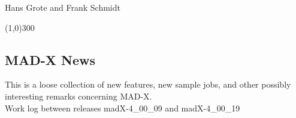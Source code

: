 

Hans Grote and Frank Schmidt 

\line(1,0){300}


\subsection{MAD-X News}
 This is a loose collection of new features, new sample jobs, and other possibly interesting remarks concerning MAD-X.  
\\

Work log between releases madX-4\_00\_09 and madX-4\_00\_19


